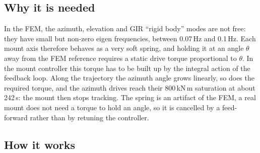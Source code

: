 \documentclass{gmto}
\numberwithin{table}{section}
\numberwithin{equation}{section}
\begin{document}
\subsection{Why it is needed}
\label{sec:ff-why}

In the FEM, the azimuth, elevation and GIR ``rigid body'' modes are not free: they have small but
non-zero eigen frequencies, between 0.07\,Hz and 0.1\,Hz. Each mount axis therefore behaves as a
very soft spring, and holding it at an angle $\theta$ away from the FEM reference requires a
static drive torque proportional to $\theta$. In the mount controller this torque has to be built
up by the integral action of the feedback loop. Along the trajectory the azimuth angle grows
linearly, so does the required torque, and the azimuth drives reach their 800\,kN\,m saturation
at about 242\,s: the mount then stops tracking. The spring is an artifact of the FEM, a real mount
does not need a torque to hold an angle, so it is cancelled by a feed-forward rather than by
retuning the controller.

\subsection{How it works}
\label{sec:ff-how}
\end{document}
